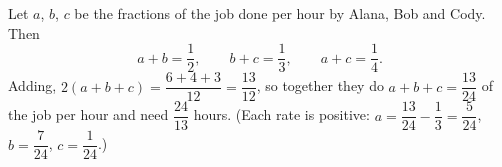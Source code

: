 Let $a$, $b$, $c$ be the fractions of the job done per hour by Alana, Bob and Cody. Then
\[
a+b=\dfrac{1}{2},\qquad b+c=\dfrac{1}{3},\qquad a+c=\dfrac{1}{4} .
\]
Adding, $2(a+b+c)=\dfrac{6+4+3}{12}=\dfrac{13}{12}$, so together they do $a+b+c=\dfrac{13}{24}$ of the job per hour and need $\boxed{\dfrac{24}{13}}$ hours. (Each rate is positive: $a=\dfrac{13}{24}-\dfrac{1}{3}=\dfrac{5}{24}$, $b=\dfrac{7}{24}$, $c=\dfrac{1}{24}$.)
